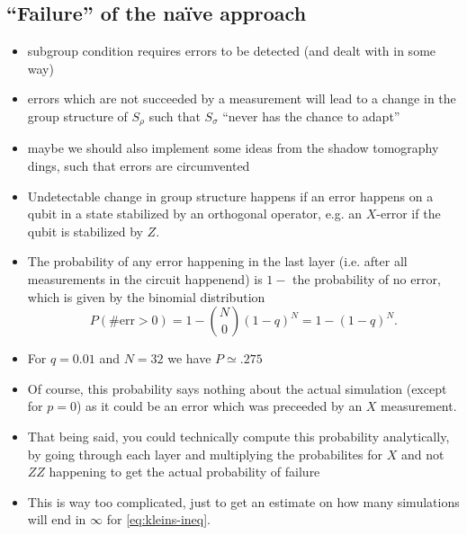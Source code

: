 \subsection{\enquote{Failure} of the na\"ive approach}

\begin{itemize}
  \item subgroup condition requires errors to be detected (and dealt with in
    some way)
  \item errors which are not succeeded by a measurement will lead to a change
    in the group structure of $S_\rho$ such that $S_\sigma$ \enquote{never has
    the chance to adapt}
  \item maybe we should also implement some ideas from the shadow tomography
    dings, such that errors are circumvented
  \item Undetectable change in group structure happens if an error happens on a
    qubit in a state stabilized by an orthogonal operator, e.g. an $X$-error if
    the qubit is stabilized by $Z$.
  \item The probability of any error happening in the last layer (i.e. after
    all measurements in the circuit happenend) is $1-$ the probability of no
    error, which is given by the binomial distribution
    \[ P(\#\mathrm{err}>0) = 1-\binom{N}{0} (1-q)^N=1-(1-q)^N. \]
  \item For $q=\num{0.01}$ and $N=32$ we have $P\simeq .275$
  \item Of course, this probability says nothing about the actual simulation
    (except for $p=0$) as it could be an error which was preceeded by an $X$
    measurement.
  \item That being said, you could technically compute this probability
    analytically, by going through each layer and multiplying the probabilites
    for \(X\) and not $ZZ$ happening to get the actual probability of failure
   \item This is way too complicated, just to get an estimate on how many
     simulations will end in $\infty$ for \cref{eq:kleins-ineq}. 
\end{itemize}

